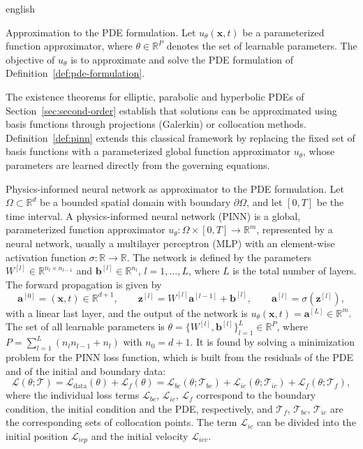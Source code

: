 \documentclass[11pt,letterpaper,twoside,openright]{book} %
\newcommand{\Loss}{\mathcal{L}}
\newcommand{\T}{\mathcal{T}}
\begin{document}
\begin{hyphenrules}{english}
\begin{definicion}{Approximation to the PDE formulation.}\label{def:pde-approx}
Let $u_\theta(\mathbf{x},t)$ be a parameterized function approximator, where $\theta\in\mathbb{R}^P$ denotes the set of
learnable parameters. The objective of $u_\theta$ is to approximate and solve the PDE formulation of
Definition~\ref{def:pde-formulation}.
\end{definicion}

The existence theorems for elliptic, parabolic and hyperbolic PDEs of Section~\ref{sec:second-order} establish
that solutions can be approximated using basis functions through projections (Galerkin) or collocation
methods. Definition~\ref{def:pinn} extends this classical framework by replacing the fixed set of basis functions
with a parameterized global function approximator $u_\theta$, whose parameters are learned directly from
the governing equations.

\begin{definicion}{Physics-informed neural network as approximator to the PDE formulation.}\label{def:pinn}
Let $\Omega\subset\mathbb{R}^d$ be a bounded spatial domain with boundary $\partial\Omega$, and let $[0,T]$ be
the time interval. A physics-informed neural network (PINN) is a global, parameterized function
approximator $u_\theta:\Omega\times[0,T]\to\mathbb{R}^{m}$, represented by a neural network, usually a
multilayer perceptron (MLP) with an element-wise activation function $\sigma:\mathbb{R}\to\mathbb{R}$. The network is
defined by the parameters $W^{[l]}\in\mathbb{R}^{n_l\times n_{l-1}}$ and $\mathbf{b}^{[l]}\in\mathbb{R}^{n_l}$,
$l=1,\dots,L$, where $L$ is the total number of layers. The forward propagation is given by
\cite{goodfellow2016}
\[
  \mathbf{a}^{[0]}=(\mathbf{x},t)\in\mathbb{R}^{d+1},\qquad
  \mathbf{z}^{[l]}=W^{[l]}\mathbf{a}^{[l-1]}+\mathbf{b}^{[l]},\qquad
  \mathbf{a}^{[l]}=\sigma(\mathbf{z}^{[l]}),
\]
with a linear last layer, and the output of the network is $u_\theta(\mathbf{x},t)=\mathbf{a}^{[L]}\in\mathbb{R}^m$. The
set of all learnable parameters is $\theta=\{W^{[l]},\mathbf{b}^{[l]}\}_{l=1}^{L}\in\mathbb{R}^{P}$, where
$P=\sum_{l=1}^{L}(n_ln_{l-1}+n_l)$ with $n_0=d+1$. It is found by solving a minimization problem for the
PINN loss function, which is built from the residuals of the PDE and of the initial and boundary data:
\[
  \Loss(\theta;\T)=\Loss_{\mathrm{data}}(\theta)+\Loss_f(\theta)
  =\Loss_{bc}(\theta;\T_{bc})+\Loss_{ic}(\theta;\T_{ic})+\Loss_f(\theta;\T_f),
\]
where the individual loss terms $\Loss_{bc}$, $\Loss_{ic}$, $\Loss_f$ correspond to the boundary
condition, the initial condition and the PDE, respectively, and $\T_f$, $\T_{bc}$, $\T_{ic}$ are the
corresponding sets of collocation points. The term $\Loss_{ic}$ can be divided into the initial
position $\Loss_{icp}$ and the initial velocity $\Loss_{icv}$.
\end{definicion}


\end{hyphenrules}
\end{document}
